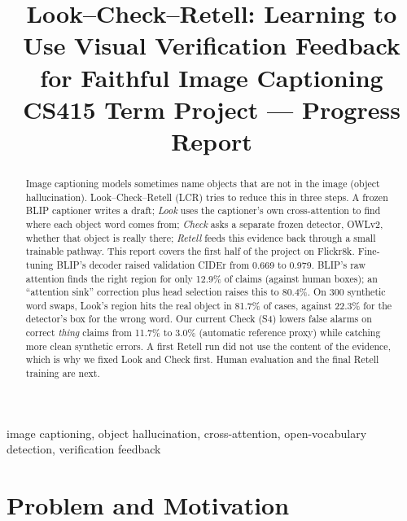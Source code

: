 \documentclass[conference]{IEEEtran}
\begin{document}
\title{Look--Check--Retell: Learning to Use Visual Verification Feedback for Faithful Image Captioning\\[2pt]
\large CS415 Term Project --- Progress Report}

\author{
}

\maketitle

\begin{abstract}
Image captioning models sometimes name objects that are not in the image (object hallucination).
Look--Check--Retell (LCR) tries to reduce this in three steps. A frozen BLIP captioner writes a draft;
\emph{Look} uses the captioner's own cross-attention to find where each object word comes from; \emph{Check}
asks a separate frozen detector, OWLv2, whether that object is really there; \emph{Retell} feeds this evidence
back through a small trainable pathway. This report covers the first half of the project on Flickr8k.
Fine-tuning BLIP's decoder raised validation CIDEr from 0.669 to 0.979. BLIP's raw attention finds the right
region for only 12.9\% of claims (against human boxes); an ``attention sink'' correction plus head selection
raises this to 80.4\%. On 300 synthetic word swaps, Look's region hits the real object in 81.7\% of cases,
against 22.3\% for the detector's box for the wrong word. Our current Check (S4) lowers false alarms on correct
\emph{thing} claims from 11.7\% to 3.0\% (automatic reference proxy) while catching more clean synthetic
errors. A first Retell run did not use the content of the evidence, which is why we fixed Look and Check first.
Human evaluation and the final Retell training are next.
\end{abstract}

\begin{IEEEkeywords}
image captioning, object hallucination, cross-attention, open-vocabulary detection, verification feedback
\end{IEEEkeywords}

\section{Problem and Motivation}
\end{document}
